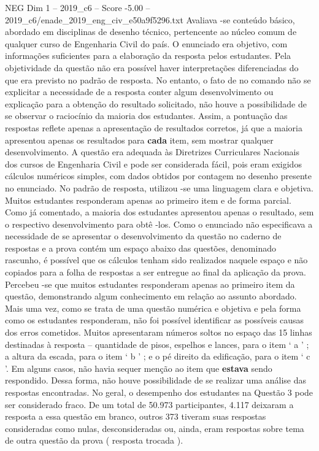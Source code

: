 \begin{textsample}{NEG Dim 1 – 2019\_c6 – Score -5.00 – 2019\_c6/enade\_2019\_eng\_civ\_e50a9f5296.txt}
Avaliava -se conteúdo básico, abordado em disciplinas de desenho técnico, pertencente ao núcleo comum de qualquer curso de Engenharia Civil do país.
O enunciado era objetivo, com informações suficientes para a elaboração da resposta pelos estudantes.
Pela objetividade da questão não era possível haver interpretações diferenciadas do que era previsto no padrão de resposta.
No entanto, o fato de no comando não se explicitar a necessidade de a resposta conter algum desenvolvimento ou explicação para a obtenção do resultado solicitado, não houve a possibilidade de se observar o raciocínio da maioria dos estudantes.
Assim, a pontuação das respostas reflete apenas a apresentação de resultados corretos, já que a maioria apresentou apenas os resultados para \textbf{cada} item, sem mostrar qualquer desenvolvimento.
A questão era adequada às Diretrizes Curriculares Nacionais dos cursos de Engenharia Civil e pode ser considerada fácil, pois eram exigidos cálculos numéricos simples, com dados obtidos por contagem no desenho presente no enunciado.
No padrão de resposta, utilizou -se uma linguagem clara e objetiva.
Muitos estudantes responderam apenas ao primeiro item e de forma parcial.
Como já comentado, a maioria dos estudantes apresentou apenas o resultado, sem o respectivo desenvolvimento para obtê -los.
Como o enunciado não especificava a necessidade de se apresentar o desenvolvimento da questão no caderno de respostas e a prova contém um espaço abaixo das questões, denominado rascunho, é possível que os cálculos tenham sido realizados naquele espaço e não copiados para a folha de respostas a ser entregue ao final da aplicação da prova.
Percebeu -se que muitos estudantes responderam apenas ao primeiro item da questão, demonstrando algum conhecimento em relação ao assunto abordado.
Mais uma vez, como se trata de uma questão numérica e objetiva e pela forma como os estudantes responderam, não foi possível identificar as possíveis causas dos erros cometidos.
Muitos apresentaram números soltos no espaço das 15 linhas destinadas à resposta – quantidade de pisos, espelhos e lances, para o item ‘ a ’ ; a altura da escada, para o item ‘ b ’ ; e o pé direito da edificação, para o item ‘ c ’.
Em alguns casos, não havia sequer menção ao item que \textbf{estava} sendo respondido.
Dessa forma, não houve possibilidade de se realizar uma análise das respostas encontradas.
No geral, o desempenho dos estudantes na Questão 3 pode ser considerado fraco.
De um total de 50.973 participantes, 4.117 deixaram a resposta a essa questão em branco, outros 373 tiveram suas respostas consideradas como nulas, desconsideradas ou, ainda, eram respostas sobre tema de outra questão da prova ( resposta trocada ).

\end{textsample}
